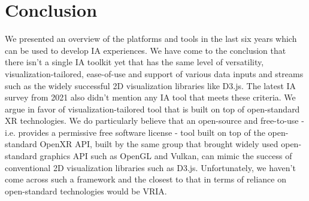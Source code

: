 \documentclass{vgtc}                          %
\begin{document}
\section{Conclusion}
We presented an overview of the platforms and tools in the last six years which
can be used to develop IA experiences. We have come to the conclusion that
there isn't a single IA toolkit yet that has the same level of versatility,
visualization-tailored, ease-of-use and support of various data inputs and
streams such as the widely successful 2D visualization libraries like D3.js.
The latest IA survey from 2021 \cite{survey_of_ia} also didn't mention any IA
tool that meets these criteria.
We argue in favor of visualization-tailored tool that is built on top of
open-standard XR technologies. We do particularly believe that an open-source
and free-to-use - i.e. provides a permissive free software license - tool built
on top of the open-standard OpenXR API, built by the same group that brought
widely used open-standard graphics API such as OpenGL and Vulkan, can mimic
the success of conventional 2D visualization libraries such as D3.js.
Unfortunately, we haven't come across such a framework and the closest to that
in terms of reliance on open-standard technologies would be VRIA.

\printbibliography
\end{document}
